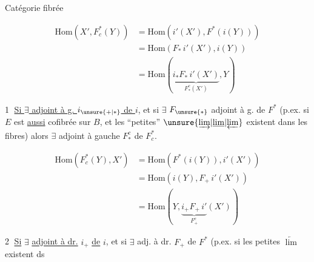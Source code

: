 

Catégorie fibrée


\[
\begin{aligned}
\mathrm{Hom}(X',F_c^*(Y))&=\mathrm{Hom}(i'(X'),F^*(i(Y)))\\
&=\mathrm{Hom}(F_*\,i'(X'),i(Y))\\
&=\mathrm{Hom}(\underbrace{i_*F_*\,i'(X')}_{F_*^c(X')},Y)
\end{aligned}
\]

\textcircled{1} \uline{Si $\exists$ adjoint à g. $i_{\unsure{+|*}}$ de $i$}, et si $\exists$ $F_{\unsure{*}}$ adjoint
à g. de $F^*$ (p.ex. si $E$ est \uline{aussi} cofibrée
sur $B$, et les ``petites'' $\unsure{\underrightarrow{\lim}|\underline{\lim}|\underleftarrow{\lim}}$ existent dans les fibres)
alors $\exists$ adjoint à gauche $F_*^c$ de ${F}_c^*$.

\[
\begin{aligned}
\mathrm{Hom}(F_c^*(Y),X')&=\mathrm{Hom}(F^*(i(Y)),i'(X'))\\
&=\mathrm{Hom}(i(Y),F_+\,i'(X'))\\
&=\mathrm{Hom}(Y,\underbrace{i_+F_+\,i'}_{F_+^c}(X'))
\end{aligned}
\]

\textcircled{2} \uline{Si} $\exists$ \uline{adjoint à dr.} $i_+$ \uline{de} $i$, et si $\exists$ adj. à dr.
$F_+$ de $F^*$ (p.ex.  si les petites $\underleftarrow{\lim}$ existent ds

